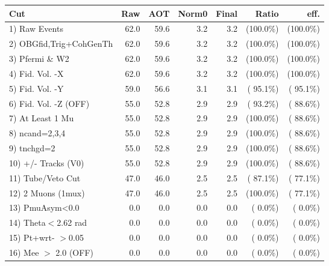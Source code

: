  \begin{table}[h!]\centering
 \begin{tabular}{||l||r|r|r|r|r|r||}
 \hline
 \hline
 Cut & Raw & AOT & Norm0 & Final & Ratio & eff.       \\
 \hline
  1) Raw Events           &         62.0 &         59.6 &          3.2 &          3.2 & (100.0\%) & (100.0\%) \\
  2) OBGfid,Trig+CohGenTh &         62.0 &         59.6 &          3.2 &          3.2 & (100.0\%) & (100.0\%) \\
  3) Pfermi \& W2         &         62.0 &         59.6 &          3.2 &          3.2 & (100.0\%) & (100.0\%) \\
  4) Fid. Vol. -X         &         62.0 &         59.6 &          3.2 &          3.2 & (100.0\%) & (100.0\%) \\
  5) Fid. Vol. -Y         &         59.0 &         56.6 &          3.1 &          3.1 & ( 95.1\%) & ( 95.1\%) \\
  6) Fid. Vol. -Z (OFF)   &         55.0 &         52.8 &          2.9 &          2.9 & ( 93.2\%) & ( 88.6\%) \\
  7) At Least 1 Mu        &         55.0 &         52.8 &          2.9 &          2.9 & (100.0\%) & ( 88.6\%) \\
  8) ncand=2,3,4          &         55.0 &         52.8 &          2.9 &          2.9 & (100.0\%) & ( 88.6\%) \\
  9) tnchgd=2             &         55.0 &         52.8 &          2.9 &          2.9 & (100.0\%) & ( 88.6\%) \\
 10) +/- Tracks (V0)      &         55.0 &         52.8 &          2.9 &          2.9 & (100.0\%) & ( 88.6\%) \\
 11) Tube/Veto Cut        &         47.0 &         46.0 &          2.5 &          2.5 & ( 87.1\%) & ( 77.1\%) \\
 12) 2 Muons (1mux)       &         47.0 &         46.0 &          2.5 &          2.5 & (100.0\%) & ( 77.1\%) \\
 13) PmuAsym<0.0          &          0.0 &          0.0 &          0.0 &          0.0 & (  0.0\%) & (  0.0\%) \\
 14) Theta$<$2.62 rad     &          0.0 &          0.0 &          0.0 &          0.0 & (  0.0\%) & (  0.0\%) \\
 15) Pt+wrt- $>$0.05      &          0.0 &          0.0 &          0.0 &          0.0 & (  0.0\%) & (  0.0\%) \\
 16) Mee $>$ 2.0  (OFF)   &          0.0 &          0.0 &          0.0 &          0.0 & (  0.0\%) & (  0.0\%) \\

\end{tabular}
\end{table}
